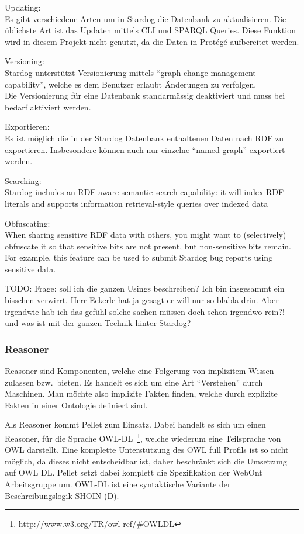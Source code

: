 Updating:\\
Es gibt verschiedene Arten um in Stardog die Datenbank zu aktualisieren. Die üblichste Art ist das Updaten mittels CLI und SPARQL Queries. Diese Funktion wird in diesem Projekt nicht genutzt, da die Daten in Protégé aufbereitet werden.

Versioning:\\
Stardog unterstützt Versionierung mittels "`graph change management capability"', welche es dem Benutzer erlaubt Änderungen zu verfolgen.\\
Die Versionierung für eine Datenbank standarmässig deaktiviert und muss bei bedarf aktiviert werden.

Exportieren:\\
Es ist möglich die in der Stardog Datenbank enthaltenen Daten nach RDF zu exportieren. Insbesondere können auch nur einzelne "`named graph"' exportiert werden.

Searching:\\
Stardog includes an RDF-aware semantic search capability: it will index RDF literals and supports information retrieval-style queries over indexed data

Obfuscating:\\
When sharing sensitive RDF data with others, you might want to (selectively) obfuscate it so that sensitive bits are not present, but non-sensitive bits remain. For example, this feature can be used to submit Stardog bug reports using sensitive data.

TODO: Frage: soll ich die ganzen Usings beschreiben? Ich bin insgesammt ein bisschen verwirrt. Herr Eckerle hat ja gesagt er will nur so blabla drin. Aber irgendwie hab ich das gefühl solche sachen müssen doch schon irgendwo rein?!
und was ist mit der ganzen Technik hinter Stardog? 
\subsubsection{Reasoner}
\label{ssubsec:reasoner}
Reasoner sind Komponenten, welche eine Folgerung von implizitem Wissen zulassen bzw.\ bieten. Es handelt es sich um eine Art ``Verstehen'' durch Maschinen. Man möchte also implizite Fakten finden, welche durch explizite Fakten in einer Ontologie definiert sind. 

Als Reasoner kommt Pellet zum Einsatz. Dabei handelt es sich um einen Reasoner, für die Sprache OWL-DL~\footnote{\url{http://www.w3.org/TR/owl-ref/\#OWLDL}}, welche wiederum eine Teilsprache von OWL darstellt. Eine komplette Unterstützung des OWL full Profils ist so nicht möglich, da dieses nicht entscheidbar ist, daher beschränkt sich die Umsetzung auf OWL DL\@. Pellet setzt dabei komplett die Spezifikation der WebOnt Arbeitsgruppe um. OWL-DL ist eine syntaktische Variante der Beschreibungslogik SHOIN (D).

